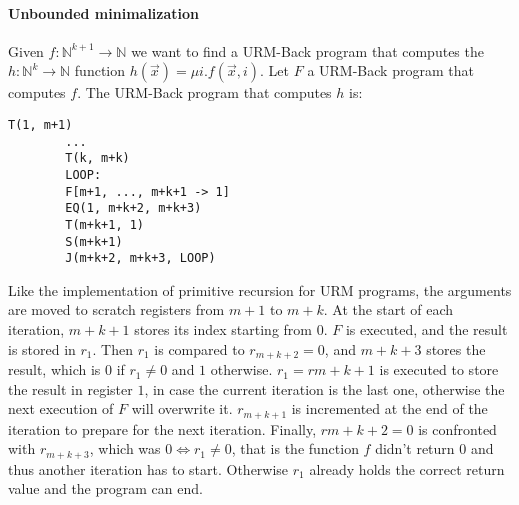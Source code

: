 \documentclass[a4paper, 12pt]{article}
\newcommand{\N}{\mathbb{N}}
\begin{document}
    \paragraph*{Unbounded minimalization} Given $f: \N^{k+1} \to \N$ we want to find a URM-Back program that computes the $h: \N^k \to \N$ function $h(\vec{x}) = \mu i . f(\vec{x}, i)$. Let $F$ a URM-Back program that computes $f$. The URM-Back program that computes $h$ is:
    \begin{lstlisting}[language=URM]
        T(1, m+1)
        ...
        T(k, m+k)
        LOOP:
        F[m+1, ..., m+k+1 -> 1]
        EQ(1, m+k+2, m+k+3)
        T(m+k+1, 1)
        S(m+k+1)
        J(m+k+2, m+k+3, LOOP)
    \end{lstlisting}
    Like the implementation of primitive recursion for URM programs, the arguments are moved to scratch registers from $m+1$ to $m+k$. At the start of each iteration, $m+k+1$ stores its index starting from 0. $F$ is executed, and the result is stored in $r_1$. Then $r_1$ is compared to $r_{m+k+2} = 0$, and $m+k+3$ stores the result, which is $0$ if $r_1 \neq 0$ and $1$ otherwise. $r_1 = r{m+k+1}$ is executed to store the result in register $1$, in case the current iteration is the last one, otherwise the next execution of $F$ will overwrite it. $r_{m+k+1}$ is incremented at the end of the iteration to prepare for the next iteration. Finally, $r{m+k+2} = 0$ is confronted with $r_{m+k+3}$, which was $0 \iff r_1 \neq 0$, that is the function $f$ didn't return $0$ and thus another iteration has to start. Otherwise $r_1$ already holds the correct return value and the program can end.
\end{document}
